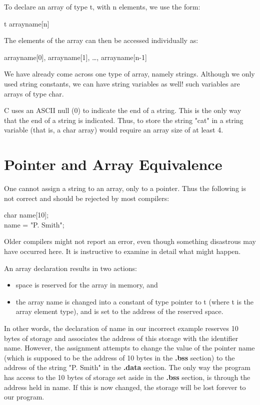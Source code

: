      To declare an array of type {\cd t\/}, with {\cd n} elements,  we
use the form:
\begin{code}
t  {\ms arrayname\/}[n]
\end{code}
\noindent
     The elements of the array can then be accessed individually as:
\begin{code}
{\ms arrayname\/}[0],  {\ms arrayname\/}[1], \ldots,  {\ms arrayname\/}[n-1]
\end{code}
\noindent
     We have  already come  across one type of array, namely 
strings.  Although we only  used string  constants, we  can have 
string variables  as well!
such variables are  arrays of type {\cd char}.

     C uses  an ASCII  null (0) to indicate the end of a string. 
This is the only way that the end of a string is indicated.
Thus, to store the string  {\cd "cat"} in  a string  variable (that
is, a {\cd char} array) would require an array size of  at least  4.


\section{Pointer and Array Equivalence}

     One cannot  assign a string to  an array,  only to a pointer.
Thus  the following is not correct and should be rejected by most
compilers:
\begin{code}
char  name[10];\\
name = "P. Smith";
\end{code}
\noindent
     Older compilers might not report  an error, even though something
disastrous may have occurred here.  It is instructive to examine in detail
what might happen.

An array declaration results in two actions:
 \begin{itemize}
\item space is reserved for the array in memory, and
\item the  array name is changed into a constant of type
{\ms pointer to t\/} (where {\ms t\/} is the array element type), and is
set to the address of the reserved space.
\end{itemize}
 In other words, the declaration  of {\cd name}  in our incorrect
example reserves 10 bytes of  storage  and  associates  the address
of  this storage with the identifier {\cd name}.  However, the
assignment attempts to change the value of the pointer {\cd name}
(which is supposed to be the address of 10 bytes in the {\bf .bss}
section) to the address of the string {\cd "P. Smith"} in the {\bf
.data} section.  The only way the program has access to the 10 bytes
of storage set aside in the {\bf .bss} section, is through the
address held in {\cd name}.  If this is now changed, the storage will
be lost forever to our program.

